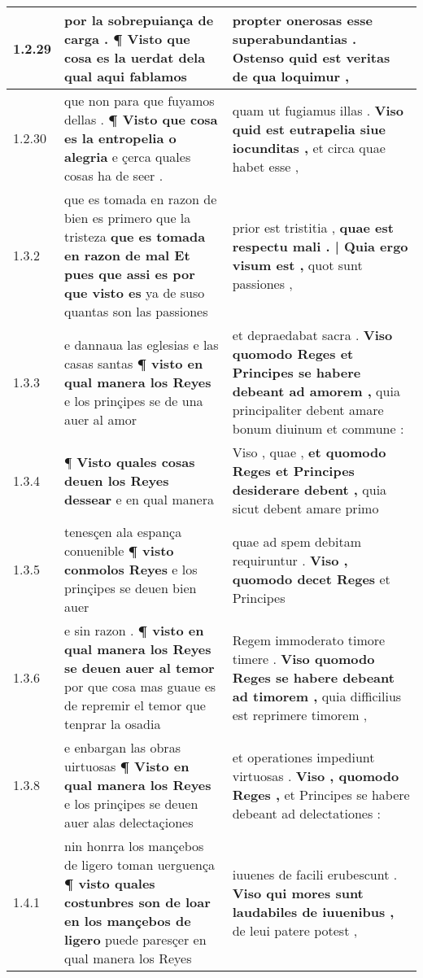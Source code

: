 \begin{tabular}{|p{1cm}|p{6.5cm}|p{6.5cm}|}
1.2.29 & por la sobrepuiança de carga . \textbf{ ¶ Visto que cosa es la uerdat } dela qual aqui fablamos & propter onerosas esse superabundantias . \textbf{ Ostenso quid est veritas } de qua loquimur , \\\hline
1.2.30 & que non para que fuyamos dellas . \textbf{ ¶ Visto que cosa es la entropelia o alegria } e çerca quales cosas ha de seer . & quam ut fugiamus illas . \textbf{ Viso quid est eutrapelia siue iocunditas , } et circa quae habet esse , \\\hline
1.3.2 & que es tomada en razon de bien es primero que la tristeza \textbf{ que es tomada en razon de mal Et pues que assi es por que visto es } ya de suso quantas son las passiones & prior est tristitia , \textbf{ quae est respectu mali . | Quia ergo visum est , } quot sunt passiones , \\\hline
1.3.3 & e dannaua las eglesias e las casas santas \textbf{ ¶ visto en qual manera los Reyes } e los prinçipes se de una auer al amor & et depraedabat sacra . \textbf{ Viso quomodo Reges et Principes se habere debeant ad amorem , } quia principaliter debent amare bonum diuinum et commune : \\\hline
1.3.4 & ¶ \textbf{ Visto quales cosas deuen los Reyes dessear } e en qual manera & Viso , quae , \textbf{ et quomodo Reges et Principes desiderare debent , } quia sicut debent amare primo \\\hline
1.3.5 & tenesçen ala espança conuenible \textbf{ ¶ visto conmolos Reyes } e los prinçipes se deuen bien auer & quae ad spem debitam requiruntur . \textbf{ Viso , quomodo decet Reges } et Principes \\\hline
1.3.6 & e sin razon . \textbf{ ¶ visto en qual manera los Reyes se deuen auer al temor } por que cosa mas guaue es de repremir el temor que tenprar la osadia & Regem immoderato timore timere . \textbf{ Viso quomodo Reges se habere debeant ad timorem , } quia difficilius est reprimere timorem , \\\hline
1.3.8 & e enbargan las obras uirtuosas \textbf{ ¶ Visto en qual manera los Reyes } e los prinçipes se deuen auer alas delectaçiones & et operationes impediunt virtuosas . \textbf{ Viso , quomodo Reges , } et Principes se habere debeant ad delectationes : \\\hline
1.4.1 & nin honrra los mançebos de ligero toman uerguença \textbf{ ¶ visto quales costunbres son de loar en los mançebos de ligero } puede paresçer en qual manera los Reyes & iuuenes de facili erubescunt . \textbf{ Viso qui mores sunt laudabiles de iuuenibus , } de leui patere potest , \\\hline

\end{tabular}
